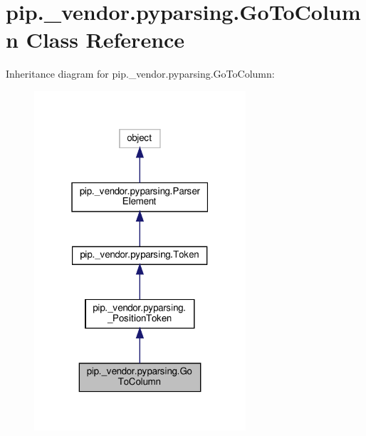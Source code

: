 \hypertarget{classpip_1_1__vendor_1_1pyparsing_1_1GoToColumn}{}\section{pip.\+\_\+vendor.\+pyparsing.\+Go\+To\+Column Class Reference}
\label{classpip_1_1__vendor_1_1pyparsing_1_1GoToColumn}


Inheritance diagram for pip.\+\_\+vendor.\+pyparsing.\+Go\+To\+Column\+:
\nopagebreak
\begin{figure}[H]
\begin{center}
\leavevmode
\includegraphics[width=223pt]{classpip_1_1__vendor_1_1pyparsing_1_1GoToColumn__inherit__graph}
\end{center}
\end{figure}


